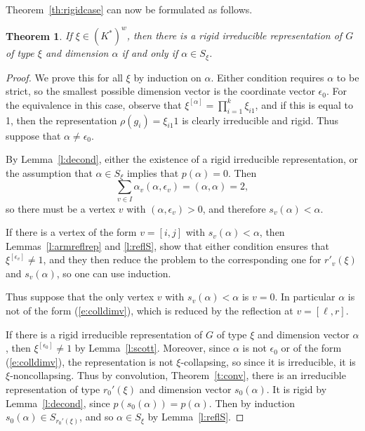 \documentclass{amsart}
\theoremstyle{plain}
\newtheorem{thm}{Theorem}[section]
\theoremstyle{definition}
\theoremstyle{remark}
\begin{document}
Theorem~\ref{th:rigidcase} can now be formulated as follows.


\begin{thm}\label{t:rigidds}
If $\xi\in (K^*)^w$, then there is a rigid irreducible representation of $G$ of
type $\xi$ and dimension $\alpha$ if and only if $\alpha\in S_\xi$.
\end{thm}


\begin{proof}
We prove this for all $\xi$ by induction on $\alpha$.
Either condition requires $\alpha$ to be strict, so the smallest
possible dimension vector is the coordinate vector $\epsilon_0$.
For the equivalence in this case, observe that
$\xi^{[\alpha]}=\prod_{i=1}^k \xi_{i1}$, and if this
is equal to 1, then the representation $\rho(g_i)=\xi_{i1} 1$
is clearly irreducible and rigid.
Thus suppose that $\alpha\neq \epsilon_0$.

By Lemma~\ref{l:decond}, either the existence of a rigid
irreducible representation, or the assumption that $\alpha\in S_\xi$
implies that $p(\alpha)=0$. Then
\[
\sum_{v\in I} \alpha_v(\alpha,\epsilon_v) = (\alpha,\alpha) = 2,
\]
so there must be a vertex $v$ with $(\alpha,\epsilon_v) > 0$, and therefore $s_v(\alpha)<\alpha$.

If there is a vertex of the form $v=[i,j]$ with $s_v(\alpha) < \alpha$,
then Lemmas~\ref{l:armreflrep} and \ref{l:reflS},
show that either condition ensures that $\xi^{[\epsilon_v]}\neq 1$, and they then reduce
the problem to the corresponding one for $r'_v(\xi)$ and $s_v(\alpha)$, so one can use induction.

Thus suppose that the only vertex $v$ with $s_v(\alpha)<\alpha$ is $v=0$.
In particular $\alpha$ is not of the form (\ref{e:colldimv}),
which is reduced by the reflection at $v=[\ell,r]$.

If there is a rigid irreducible representation of $G$ of
type $\xi$ and dimension vector $\alpha$, then
$\xi^{[\epsilon_0]}\neq 1$ by Lemma~\ref{l:scott}.
Moreover, since $\alpha$ is not $\epsilon_0$ or of the form (\ref{e:colldimv}),
the representation is not $\xi$-collapsing, so since it
is irreducible, it is $\xi$-noncollapsing.
Thus by convolution, Theorem~\ref{t:conv}, there is an irreducible
representation of type $r_0'(\xi)$ and dimension vector $s_0(\alpha)$.
It is rigid by Lemma~\ref{l:decond}, since $p(s_0(\alpha)) = p(\alpha)$.
Then by induction $s_0(\alpha)\in S_{r_0'(\xi)}$, and so $\alpha\in S_\xi$
by Lemma~\ref{l:reflS}.


\end{proof}
\end{document}
